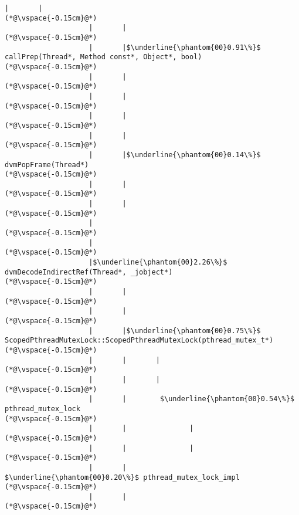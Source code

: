 \begin{lstlisting}[caption=Metodikutsu C$\to$Java 20 viiteparametrilla, label=profile:C2JBenchmark00206, numberbychapter=true, frame=lines, float, floatplacement=t]
                    |       |
(*@\vspace{-0.15cm}@*)
                    |       |
(*@\vspace{-0.15cm}@*)
                    |       |$\underline{\phantom{00}0.91\%}$ callPrep(Thread*, Method const*, Object*, bool)
(*@\vspace{-0.15cm}@*)
                    |       |        
(*@\vspace{-0.15cm}@*)
                    |       |        
(*@\vspace{-0.15cm}@*)
                    |       |
(*@\vspace{-0.15cm}@*)
                    |       |
(*@\vspace{-0.15cm}@*)
                    |       |$\underline{\phantom{00}0.14\%}$ dvmPopFrame(Thread*)
(*@\vspace{-0.15cm}@*)
                    |       |
(*@\vspace{-0.15cm}@*)
                    |       |
(*@\vspace{-0.15cm}@*)
                    |
(*@\vspace{-0.15cm}@*)
                    |
(*@\vspace{-0.15cm}@*)
                    |$\underline{\phantom{00}2.26\%}$ dvmDecodeIndirectRef(Thread*, _jobject*)
(*@\vspace{-0.15cm}@*)
                    |       |
(*@\vspace{-0.15cm}@*)
                    |       |
(*@\vspace{-0.15cm}@*)
                    |       |$\underline{\phantom{00}0.75\%}$ ScopedPthreadMutexLock::ScopedPthreadMutexLock(pthread_mutex_t*)
(*@\vspace{-0.15cm}@*)
                    |       |       |
(*@\vspace{-0.15cm}@*)
                    |       |       |
(*@\vspace{-0.15cm}@*)
                    |       |        $\underline{\phantom{00}0.54\%}$ pthread_mutex_lock
(*@\vspace{-0.15cm}@*)
                    |       |               |
(*@\vspace{-0.15cm}@*)
                    |       |               |
(*@\vspace{-0.15cm}@*)
                    |       |                $\underline{\phantom{00}0.20\%}$ pthread_mutex_lock_impl
(*@\vspace{-0.15cm}@*)
                    |       |
(*@\vspace{-0.15cm}@*)

\end{lstlisting}
